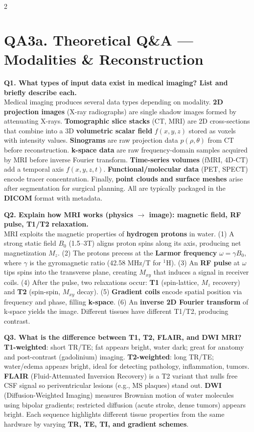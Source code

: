 \begin{paracol}{2}
\section*{QA3a. Theoretical Q\&A --- Modalities \& Reconstruction}

\textbf{Q1. What types of input data exist in medical imaging? List and briefly describe each.}\\
Medical imaging produces several data types depending on modality. \textbf{2D projection images} (X-ray radiographs) are single shadow images formed by attenuating X-rays. \textbf{Tomographic slice stacks} (CT, MRI) are 2D cross-sections that combine into a 3D \textbf{volumetric scalar field} $f(x,y,z)$ stored as voxels with intensity values. \textbf{Sinograms} are raw projection data $p(\rho,\theta)$ from CT before reconstruction. \textbf{k-space data} are raw frequency-domain samples acquired by MRI before inverse Fourier transform. \textbf{Time-series volumes} (fMRI, 4D-CT) add a temporal axis $f(x,y,z,t)$. \textbf{Functional/molecular data} (PET, SPECT) encode tracer concentration. Finally, \textbf{point clouds and surface meshes} arise after segmentation for surgical planning. All are typically packaged in the \textbf{DICOM} format with metadata.

\textbf{Q2. Explain how MRI works (physics $\to$ image): magnetic field, RF pulse, T1/T2 relaxation.}\\
MRI exploits the magnetic properties of \textbf{hydrogen protons} in water. (1) A strong static field $B_0$ (1.5--3T) aligns proton spins along its axis, producing net magnetization $M_z$. (2) The protons precess at the \textbf{Larmor frequency} $\omega = \gamma B_0$, where $\gamma$ is the gyromagnetic ratio (42.58 MHz/T for $^1$H). (3) An \textbf{RF pulse} at $\omega$ tips spins into the transverse plane, creating $M_{xy}$ that induces a signal in receiver coils. (4) After the pulse, two relaxations occur: \textbf{T1} (spin-lattice, $M_z$ recovery) and \textbf{T2} (spin-spin, $M_{xy}$ decay). (5) \textbf{Gradient coils} encode spatial position via frequency and phase, filling \textbf{k-space}. (6) An \textbf{inverse 2D Fourier transform} of k-space yields the image. Different tissues have different T1/T2, producing contrast.

\textbf{Q3. What is the difference between T1, T2, FLAIR, and DWI MRI?}\\
\textbf{T1-weighted}: short TR/TE; fat appears bright, water dark; great for anatomy and post-contrast (gadolinium) imaging. \textbf{T2-weighted}: long TR/TE; water/edema appears bright, ideal for detecting pathology, inflammation, tumors. \textbf{FLAIR} (Fluid-Attenuated Inversion Recovery) is a T2 variant that nulls free CSF signal so periventricular lesions (e.g., MS plaques) stand out. \textbf{DWI} (Diffusion-Weighted Imaging) measures Brownian motion of water molecules using bipolar gradients; restricted diffusion (acute stroke, dense tumors) appears bright. Each sequence highlights different tissue properties from the same hardware by varying \textbf{TR, TE, TI, and gradient schemes}.


\end{paracol}
